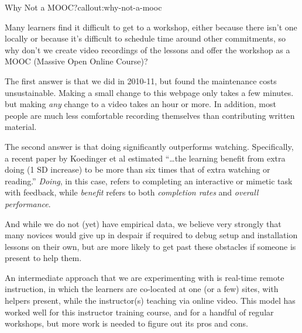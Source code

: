 \begin{callout}{Why Not a MOOC?}{callout:why-not-a-mooc}

Many learners find it difficult to get to a workshop, either because
there isn't one locally or because it's difficult to schedule time
around other commitments, so why don't we create video recordings of the
lessons and offer the workshop as a MOOC (Massive Open Online Course)?

The first answer is that we did in 2010-11, but found the maintenance
costs unsustainable. Making a small change to this webpage only takes a
few minutes. but making \emph{any} change to a video takes an hour or
more. In addition, most people are much less comfortable recording
themselves than contributing written material.

The second answer is that doing significantly outperforms watching.
Specifically, a
recent paper by Koedinger et al \cite{bib:koedinger-doing-watching}
estimated ``\ldots{}the learning benefit from
extra doing (1 SD increase) to be more than six times that of extra
watching or reading.'' \emph{Doing}, in this case, refers to completing
an interactive or mimetic task with feedback, while \emph{benefit}
refers to both \emph{completion rates} and \emph{overall performance}.

And while we do not (yet) have empirical data, we believe very strongly
that many novices would give up in despair if required to debug setup
and installation lessons on their own, but are more likely to get past
these obstacles if someone is present to help them.

An intermediate approach that we are experimenting with is real-time
remote instruction, in which the learners are co-located at one (or a
few) sites, with helpers present, while the instructor(s) teaching via
online video. This model has worked well for this instructor training
course, and for a handful of regular workshops, but more work is needed
to figure out its pros and cons.
\end{callout}
